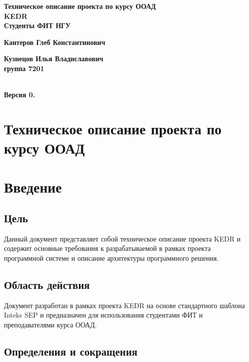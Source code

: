 \documentclass[pdftex,12pt,a4paper]{report}
\begin{document}
\begin{titlepage}
\begin{flushright}
	{\huge
	\textbf{Техническое описание проекта по курсу ООАД}
\\[1cm]
	\textbf{KEDR}
\\[1cm]
	\textbf{Студенты ФИТ НГУ}

	\textbf{Кантеров Глеб Константинович}

	\textbf{Кузнецов Илья Владиславович}
\\[1cm]
	\textbf{группа 7201}
	}
\\[1cm]
	{\large \textbf{Версия 0.\svnInfoRevision}}
\end{flushright}
\end{titlepage}

\tableofcontents
\newpage

\section*{Техническое описание проекта по курсу ООАД}
\section{Введение}
\subsection{Цель}
Данный документ представляет собой техническое описание проекта KEDR и содержит основные требования к разрабатываемой в рамках проекта программной системе и описание архитектуры программного решения.

\subsection{Область действия}
Документ разработан в рамках проекта KEDR на основе стандартного шаблона Inteks SEP и предназначен для использования студентами ФИТ и преподавателями курса ООАД.

\subsection{Определения и сокращения}
\end{document}
